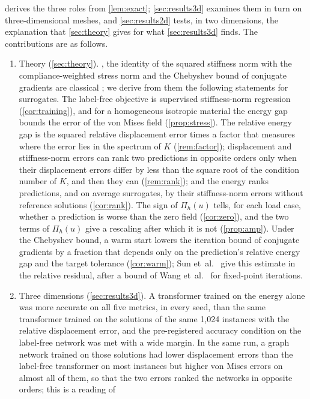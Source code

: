  derives the three roles from \cref{lem:exact}; \cref{sec:results3d}
examines them in turn on three-dimensional meshes, and \cref{sec:results2d} tests, in two
dimensions, the explanation that \cref{sec:theory} gives for what \cref{sec:results3d}
finds. The contributions are as follows.
\begin{enumerate}
\item Theory (\cref{sec:theory}). , the identity of the squared stiffness
norm with the compliance-weighted stress norm and the Chebyshev bound of conjugate
gradients are classical \cite{Ciarlet1978,Saad2003}; we derive from them the following
statements for surrogates. The label-free objective is supervised stiffness-norm regression
(\cref{cor:training}), and for a homogeneous isotropic material the energy gap bounds the
error of the von Mises field (\cref{prop:stress}). The relative energy gap is the squared
relative displacement error times a factor that measures where the error lies in the
spectrum of $K$ (\cref{rem:factor}); displacement and stiffness-norm errors can rank two
predictions in opposite orders only when their displacement errors differ by less than the
square root of the condition number of $K$, and then they can (\cref{rem:rank}); and the
energy ranks predictions, and on average surrogates, by their stiffness-norm errors
without reference solutions (\cref{cor:rank}). The sign of $\Pi_h(u)$ tells, for each load
case, whether a prediction is worse than the zero field (\cref{cor:zero}), and the two terms
of $\Pi_h(u)$ give a rescaling after which it is not (\cref{prop:amp}). Under the Chebyshev
bound, a warm start lowers the iteration bound of conjugate gradients by a fraction that
depends only on the prediction's relative energy gap and the target tolerance
(\cref{cor:warm}); Sun et~al.~\cite{Sun2026FEVessel} give this estimate in the relative
residual, after a bound of Wang et~al.~\cite{Wang2026PretrainFEM} for fixed-point
iterations.
\item Three dimensions (\cref{sec:results3d}). A transformer trained on the energy alone was
more accurate on all five metrics, in every seed, than the same transformer trained on the
solutions of the same 1,024 instances with the relative displacement error, and the
pre-registered accuracy condition on the label-free network was met with a wide margin. In
the same run, a graph network trained on those solutions had lower displacement errors than
the label-free transformer on most instances but higher von Mises errors on almost all of
them, so that the two errors ranked the networks in opposite orders; this is a reading of

\end{enumerate}
